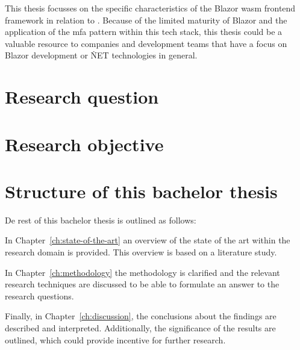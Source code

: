 This thesis focusses on the specific characteristics of the Blazor \gls{wasm}
\gls{frontend} framework in relation to . Because of
the limited maturity of Blazor and the application of the \gls{mfa} pattern
within this tech stack, this thesis could be a valuable resource to companies
and development teams that have a focus on Blazor development or \.NET
technologies in general.

\section{Research question}
\label{sec:research-question}


\section{Research objective}
\label{sec:research-objective}


\section{Structure of this bachelor thesis}
\label{sec:structure}


De rest of this bachelor thesis is outlined as follows:

In Chapter~\ref{ch:state-of-the-art} an overview of the state of the art within
the research domain is provided. This overview is based on a literature study.

In Chapter~\ref{ch:methodology} the methodology is clarified and the relevant
research techniques are discussed to be able to formulate an answer to the
research questions.


Finally, in Chapter~\ref{ch:discussion}, the conclusions about the findings are
described and interpreted. Additionally, the significance of the results are
outlined, which could provide incentive for further research.